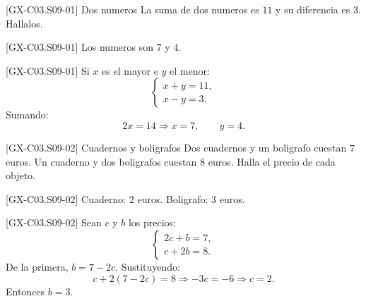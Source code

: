 \begin{guidedexercise}{[GX-C03.S09-01] Dos numeros}
La suma de dos numeros es \(11\) y su diferencia es \(3\). Hallalos.
\end{guidedexercise}

\begin{shortanswer}{[GX-C03.S09-01]}
Los numeros son \(7\) y \(4\).
\end{shortanswer}

\begin{fullsolution}{[GX-C03.S09-01]}
Si \(x\) es el mayor e \(y\) el menor:
\[
\begin{cases}
x+y=11,\\
x-y=3.
\end{cases}
\]
Sumando:
\[
2x=14 \Longrightarrow x=7,\qquad y=4.
\]
\end{fullsolution}

\begin{guidedexercise}{[GX-C03.S09-02] Cuadernos y boligrafos}
Dos cuadernos y un boligrafo cuestan \(7\) euros. Un cuaderno y dos boligrafos cuestan \(8\)
euros. Halla el precio de cada objeto.
\end{guidedexercise}

\begin{shortanswer}{[GX-C03.S09-02]}
Cuaderno: \(2\) euros. Boligrafo: \(3\) euros.
\end{shortanswer}

\begin{fullsolution}{[GX-C03.S09-02]}
Sean \(c\) y \(b\) los precios:
\[
\begin{cases}
2c+b=7,\\
c+2b=8.
\end{cases}
\]
De la primera, \(b=7-2c\). Sustituyendo:
\[
c+2(7-2c)=8 \Longrightarrow -3c=-6 \Longrightarrow c=2.
\]
Entonces \(b=3\).
\end{fullsolution}

